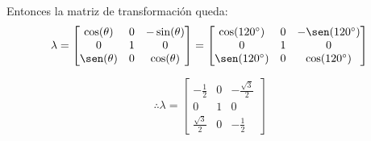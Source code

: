 \vspace{5 mm}
Entonces la matriz de transformación queda:
\vspace{5 mm}
\begin{equation*}
    \lambda = \begin{bmatrix}
        \cos(\theta) & 0 & -\sin(\theta) \\
        0 & 1 & 0 \\
        \sen(\theta) & 0 & \cos(\theta)
       \end{bmatrix}
    = \begin{bmatrix}
        \cos(120^\circ) & 0 & -\sen(120^\circ) \\
        0 & 1 & 0 \\
        \sen(120^\circ) & 0 & \cos(120^\circ)
    \end{bmatrix}
\end{equation*}

\vspace{5 mm}
\begin{equation*}
    \therefore \lambda = \begin{bmatrix}
        -\frac{1}{2} & 0 & -\frac{\sqrt{3}}{2} \\
        0 & 1 & 0 \\
        \frac{\sqrt{3}}{2} & 0 & -\frac{1}{2}
    \end{bmatrix}
\end{equation*}